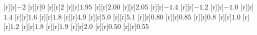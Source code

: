 \begin{psfrags}
%
[r][r]{$-2$}%
[r][r]{$0$}%
[r][r]{$2$}%
[r][r]{$1.95$}%
[r][r]{$2.00$}%
[r][r]{$2.05$}%
[r][r]{$-1.4$}%
[r][r]{$-1.2$}%
[r][r]{$-1.0$}%
[r][r]{$1.4$}%
[r][r]{$1.6\!$}%
[r][r]{$1.8$}%
[r][r]{$4.9$}%
[r][r]{$5.0$}%
[r][r]{$5.1$}%
[r][r]{$0.80$}%
[r][r]{$0.85$}%
[r][r]{$0.8$}%
[r][r]{$1.0$}%
[r][r]{$1.2$}%
[r][r]{$1.8\!$}%
[r][r]{$1.9$}%
[r][r]{$2.0$}%
[r][r]{$0.50$}%
[r][r]{$0.55$}%
%
%
\end{psfrags}%
%
